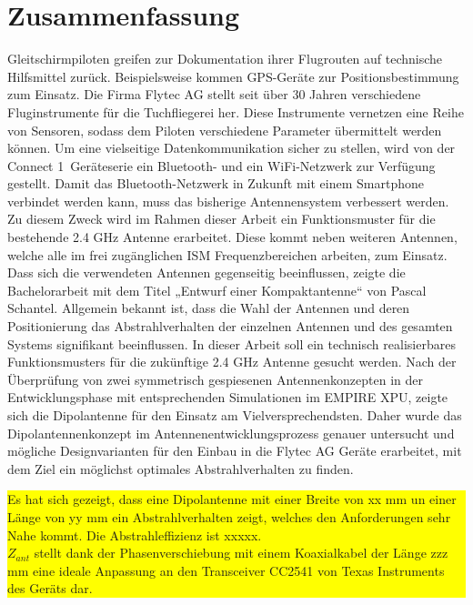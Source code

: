 \newpage
\section*{Zusammenfassung}

Gleitschirmpiloten greifen zur Dokumentation ihrer Flugrouten auf technische Hilfsmittel zurück. Beispielsweise kommen GPS-Geräte zur Positionsbestimmung zum Einsatz. Die Firma Flytec AG stellt seit über 30 Jahren verschiedene Fluginstrumente für die Tuchfliegerei her. Diese Instrumente vernetzen eine Reihe von Sensoren, sodass dem Piloten verschiedene Parameter übermittelt werden können. Um eine vielseitige Datenkommunikation sicher zu stellen, wird von der \glqq Connect 1\grqq \  Geräteserie ein Bluetooth- und ein WiFi-Netzwerk zur Verfügung gestellt. Damit das Bluetooth-Netzwerk in Zukunft mit einem Smartphone verbindet werden kann, muss das bisherige Antennensystem verbessert werden. Zu diesem Zweck wird im Rahmen dieser Arbeit ein Funktionsmuster für die bestehende 2.4 GHz Antenne erarbeitet. Diese kommt  neben weiteren Antennen, welche alle im frei zugänglichen ISM Frequenzbereichen arbeiten, zum Einsatz. Dass sich die verwendeten Antennen gegenseitig beeinflussen, zeigte die Bachelorarbeit mit dem Titel „Entwurf einer Kompaktantenne“ von Pascal Schantel.
Allgemein bekannt ist, dass die Wahl der Antennen und deren Positionierung das Abstrahlverhalten der einzelnen Antennen und des gesamten Systems signifikant beeinflussen. In dieser Arbeit soll ein technisch realisierbares Funktionsmusters für die zukünftige 2.4 GHz Antenne gesucht werden.  Nach der Überprüfung von zwei symmetrisch gespiesenen Antennenkonzepten in der Entwicklungsphase mit entsprechenden Simulationen im EMPIRE XPU, zeigte sich die Dipolantenne für den Einsatz am Vielversprechendsten. Daher wurde das Dipolantennenkonzept im Antennenentwicklungsprozess genauer untersucht und mögliche Designvarianten für den Einbau in die Flytec AG Geräte erarbeitet, mit dem Ziel ein möglichst optimales Abstrahlverhalten zu finden.\\
  \colorbox{yellow}{\parbox[t]{\textwidth}{Es hat sich gezeigt, dass eine Dipolantenne mit einer Breite von xx mm un einer Länge von yy mm 
   ein Abstrahlverhalten zeigt, welches den Anforderungen sehr Nahe kommt. 
   Die Abstrahleffizienz ist xxxxx.\\
   $Z_{ant}$ stellt dank der Phasenverschiebung  mit einem  Koaxialkabel der Länge zzz mm eine ideale Anpassung  an den Transceiver CC2541 von Texas Instruments des Geräts dar.}}\\


